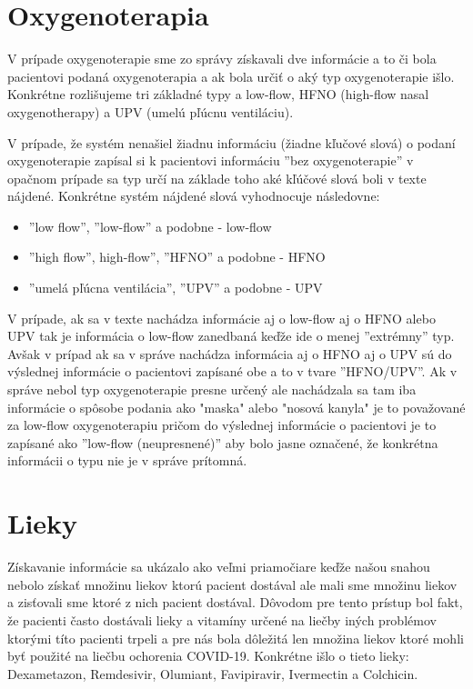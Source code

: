 \section{Oxygenoterapia}

V prípade oxygenoterapie sme zo správy získavali dve informácie a to či bola pacientovi podaná oxygenoterapia a ak bola určiť o aký typ oxygenoterapie išlo. Konkrétne rozlišujeme tri základné typy a low-flow, HFNO (high-flow nasal oxygenotherapy) a UPV (umelú pľúcnu ventiláciu). 

V prípade, že systém nenašiel žiadnu informáciu (žiadne kľučové slová) o podaní oxygenoterapie zapísal si k pacientovi informáciu ''bez oxygenoterapie'' v opačnom prípade sa typ určí na základe toho aké kľúčové slová boli v texte nájdené. Konkrétne systém nájdené slová vyhodnocuje následovne:

\begin{itemize}
	\item ''low flow'', ''low-flow'' a podobne - low-flow
	\item ''high flow'', high-flow'', ''HFNO'' a podobne - HFNO
	\item ''umelá pľúcna ventilácia'', ''UPV'' a podobne - UPV
\end{itemize}

V prípade, ak sa v texte nachádza informácie aj o low-flow aj o HFNO alebo UPV tak je informácia o low-flow zanedbaná keďže ide o menej ''extrémny'' typ. Avšak v prípad ak sa v správe nachádza informácia aj o HFNO aj o UPV sú do výslednej informácie o pacientovi zapísané obe a to v tvare ''HFNO/UPV''. Ak v správe nebol typ oxygenoterapie presne určený ale nachádzala sa tam iba informácie o spôsobe podania ako "maska" alebo "nosová kanyla" je to považované za low-flow oxygenoterapiu pričom do výslednej informácie o pacientovi je to zapísané ako ''low-flow (neupresnené)'' aby bolo jasne označené, že konkrétna informácii o typu nie je v správe prítomná.

\section{Lieky}

Získavanie informácie sa ukázalo ako veľmi priamočiare keďže našou snahou nebolo získať množinu liekov ktorú pacient dostával ale mali sme množinu liekov a zisťovali sme ktoré z nich pacient dostával. Dôvodom pre tento prístup bol fakt, že pacienti často dostávali lieky a vitamíny určené na liečby iných problémov ktorými títo pacienti trpeli a pre nás bola dôležitá len množina liekov ktoré mohli byť použité na liečbu ochorenia COVID-19. Konkrétne išlo o tieto lieky: Dexametazon, Remdesivir, Olumiant, Favipiravir, Ivermectin a Colchicin.

